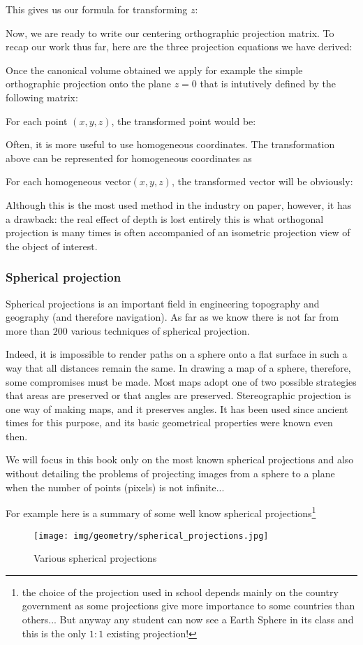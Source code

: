 	This gives us our formula for transforming $z$:
	
	Now, we are ready to write our centering orthographic projection matrix. To recap our work thus far, here are the three projection equations we have derived:
	
	Once the canonical volume obtained we apply for example the simple orthographic projection onto the plane $z = 0$ that is intutively defined by the following matrix:
	
	For each point $(x, y, z)$, the transformed point would be:
	
	Often, it is more useful to use homogeneous coordinates. The transformation above can be represented for homogeneous coordinates as
	
	For each homogeneous vector$(x,y,z)$, the transformed vector will be obviously:
	
	Although this is the most used method in the industry on paper, however, it has a drawback: the real effect of depth is lost entirely this is what orthogonal projection is many times is often accompanied of an isometric projection view of the object of interest.
	
	\pagebreak
	\subsubsection{Spherical projection}
	Spherical projections is an important field in engineering topography and geography (and therefore navigation). As far as we know there is not far from more than $200$ various techniques of spherical projection. 
	
	Indeed, it is impossible to render paths on a sphere onto a flat surface in such a way that all distances remain the same. In drawing a map of a sphere, therefore, some compromises must be made. Most maps adopt one of two possible strategies that areas are preserved or that angles are preserved. Stereographic projection is one way of making maps, and it preserves angles. It has been used since ancient times for this purpose, and its basic geometrical properties were known even then.

	We will focus in this book only on the most known spherical projections and also without detailing the problems of projecting images from a sphere to a plane when the number of points (pixels) is not infinite...
	
	For example here is a summary of some well know spherical projections\footnote{the choice of the projection used in school depends mainly on the country government as some projections give more importance to some countries than others... But anyway any student can now see a Earth Sphere in its class and this is the only $1:1$ existing projection!}
	\begin{figure}[H]
		\centering
		\texttt{[image: img/geometry/spherical\_projections.jpg]}
		\caption{Various spherical projections}
	\end{figure}
	
